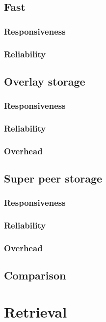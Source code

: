             \subsection{Fast}
                \subsubsection{Responsiveness}
                \subsubsection{Reliability}
            \subsection{Overlay storage}
                \subsubsection{Responsiveness}
                \subsubsection{Reliability}
                \subsubsection{Overhead}
            \subsection{Super peer storage}
                \subsubsection{Responsiveness}
                \subsubsection{Reliability}
                \subsubsection{Overhead}
            \subsection{Comparison}

    \section{Retrieval}

